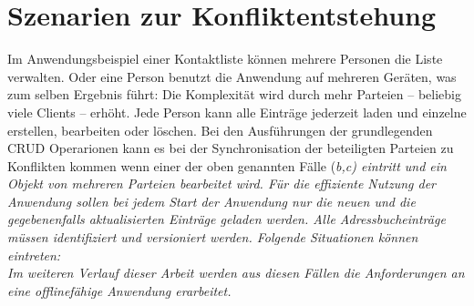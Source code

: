 \section{\label{sec:konfliktszenarien}Szenarien zur Konfliktentstehung}
Im Anwendungsbeispiel einer Kontaktliste können mehrere Personen die Liste verwalten. Oder eine Person benutzt die Anwendung auf mehreren Geräten, was zum selben Ergebnis führt:
Die Komplexität wird durch mehr Parteien -- beliebig viele Clients -- erhöht.
Jede Person kann alle Einträge jederzeit laden und einzelne erstellen, bearbeiten oder löschen. Bei den Ausführungen der grundlegenden \gls{CRUD} Operarionen kann es bei der Synchronisation der beteiligten Parteien zu Konflikten kommen wenn einer der oben genannten Fälle (\it{b,c}) eintritt und ein Objekt von mehreren Parteien bearbeitet wird.
Für die effiziente Nutzung der Anwendung sollen bei jedem Start der Anwendung nur die neuen und die gegebenenfalls aktualisierten Einträge geladen werden. Alle Adressbucheinträge müssen identifiziert und versioniert werden. Folgende Situationen können eintreten:
%
\\
%
Im weiteren Verlauf dieser Arbeit werden aus diesen Fällen die Anforderungen an eine offlinefähige Anwendung erarbeitet.